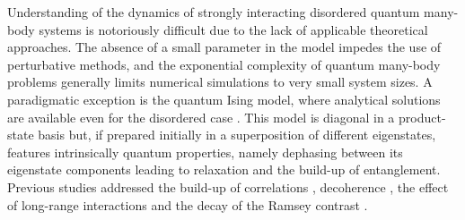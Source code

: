 \documentclass[aps,twocolumn,
superscriptaddress,
footinbib,
prl]{revtex4-1}
\begin{document}
Understanding of the dynamics of strongly interacting disordered quantum many-body systems is notoriously difficult due to the lack of applicable theoretical approaches. The absence of a small parameter in the model impedes the use of perturbative methods, and the exponential complexity of quantum many-body problems generally limits numerical simulations to very small system sizes.
A paradigmatic exception is the quantum Ising model, where analytical solutions are available even for the disordered case \cite{Emch1966Non-markovianEquilibrium, Radin1970ApproachModel}. This model is diagonal in a product-state basis but, if prepared initially in a superposition of different eigenstates, features intrinsically quantum properties, namely dephasing between its eigenstate components leading to relaxation and the build-up of entanglement. 
Previous studies addressed the build-up of correlations \cite{Hazzard2014QuantumSystems}, decoherence \cite{Foss-Feig2013NonequilibriumSolution}, the effect of long-range interactions \cite{doi:10.1063/1.470956, Kastner2011DivergingModels, VanDenWorm2013RelaxationSimulatorb} and the decay of the Ramsey contrast \cite{Mukherjee2016AccessingDynamicsb, PhysRevA.94.053607}.

\end{document}
